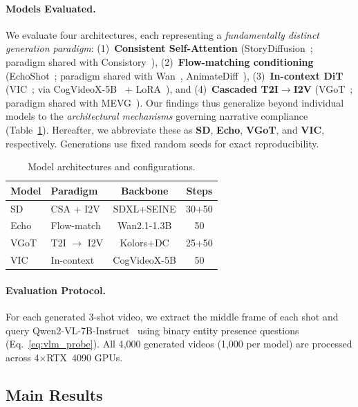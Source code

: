 \documentclass[sigconf,review,anonymous]{acmart}
\theoremstyle{definition}
\begin{document}
\paragraph{Models Evaluated.}
We evaluate four architectures, each representing a \emph{fundamentally distinct generation paradigm}:
(1)~\textbf{Consistent Self-Attention} (StoryDiffusion~\cite{storydiff}; paradigm shared with Consistory~\cite{consistory}),
(2)~\textbf{Flow-matching conditioning} (EchoShot~\cite{echoshot}; paradigm shared with Wan~\cite{wan}, AnimateDiff~\cite{animatediff}),
(3)~\textbf{In-context DiT} (VIC~\cite{vic}; via CogVideoX-5B~\cite{cogvideox} + LoRA~\cite{lora}), and
(4)~\textbf{Cascaded T2I$\to$I2V} (VGoT~\cite{vgot}; paradigm shared with MEVG~\cite{mevg}).
Our findings thus generalize beyond individual models to the \emph{architectural mechanisms} governing narrative compliance (Table~\ref{tab:models}). Hereafter, we abbreviate these as \textbf{SD}, \textbf{Echo}, \textbf{VGoT}, and \textbf{VIC}, respectively. Generations use fixed random seeds for exact reproducibility.

\begin{table}[t]
\caption{Model architectures and configurations.}
\label{tab:models}
\centering
\small
\setlength{\tabcolsep}{3pt}
\begin{tabular}{@{}llcc@{}}
\toprule
Model & Paradigm & Backbone & Steps \\
\midrule
SD & CSA + I2V & SDXL+SEINE & 30+50 \\
Echo & Flow-match & Wan2.1-1.3B & 50 \\
VGoT & T2I $\to$ I2V & Kolors+DC & 25+50 \\
VIC & In-context & CogVideoX-5B & 50 \\
\bottomrule
\end{tabular}
\end{table}

\paragraph{Evaluation Protocol.}
For each generated 3-shot video, we extract the middle frame of each shot and query Qwen2-VL-7B-Instruct~\cite{qwen2vl} using binary entity presence questions (Eq.~\eqref{eq:vlm_probe}). All 4{,}000 generated videos (1{,}000 per model) are processed across 4$\times$RTX~4090 GPUs.

\subsection{Main Results}
\label{sec:main_results}
\end{document}
